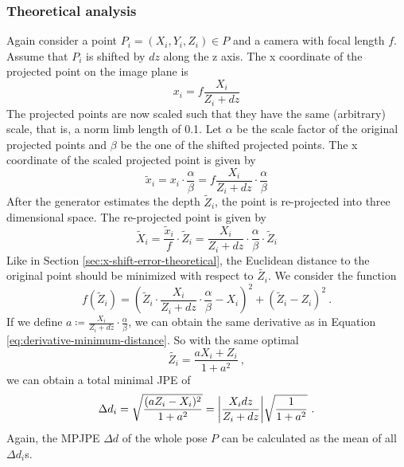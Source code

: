 \subsubsection{Theoretical analysis}
Again consider a point $P_i=(X_i, Y_i, Z_i) \in P$ and a camera with focal length $f$. Assume that $P_i$ is shifted by $dz$ along the z axis.
The x coordinate of the projected point on the image plane is
\begin{equation}
	x_i = f \frac{X_i}{Z_i + dz}
\end{equation}
The projected points are now scaled such that they have the same (arbitrary) scale, that is, a norm limb length of 0.1.
Let $\alpha$ be the scale factor of the original projected points and $\beta$ be the one of the shifted projected points. 
The x coordinate of the scaled projected point is given by
\begin{equation}
		\widetilde{x}_i = x_i \cdot \frac{\alpha}{\beta} 
		= f \frac{X_i}{Z_i + dz}\cdot \frac{\alpha}{\beta} 
\end{equation}
After the generator estimates the depth $\widetilde{Z}_i$, the point is re-projected into three dimensional space.
The re-projected point is given by
\begin{equation}
	\widetilde{X}_i = \frac{\widetilde{x}_i}{f} \cdot \widetilde{Z}_i
	= \frac{X_i}{Z_i + dz}\cdot \frac{\alpha}{\beta}  \cdot \widetilde{Z}_i
\end{equation}
Like in Section \ref{sec:x-shift-error-theoretical}, the Euclidean distance to the original point should be minimized with respect to $\widetilde{Z_i}$.
We consider the function
\begin{equation}
	f(\widetilde{Z}_i) = \left ( \widetilde{Z}_i \cdot \frac{X_i}{Z_i + dz}\cdot \frac{\alpha}{\beta} - X_i \right)^2 + ( \widetilde{Z}_i - Z_i )^2 \ .
\end{equation}
If we define $a \coloneqq \frac{X_i}{Z_i + dz}\cdot \frac{\alpha}{\beta}$, we can obtain the same derivative as in Equation \eqref{eq:derivative-minimum-distance}.
So with the same optimal 
\begin{equation}
	\widetilde{Z_i} = \frac{a X_i + Z_i}{1 + a^2} \ ,
\end{equation}
we can obtain a total minimal JPE of 
\begin{equation}
	\Delta d_i = \sqrt{\frac{(a Z_i - X_i)^2}{1 + a^2}} 
	= \abs{\frac{X_i dz}{Z_i + dz}} \sqrt{\frac{1}{1 + a^2}} \ .
\end{equation}
Again, the MPJPE $\Delta d$ of the whole pose $P$ can be calculated as the mean of all $\Delta d_i$s.

